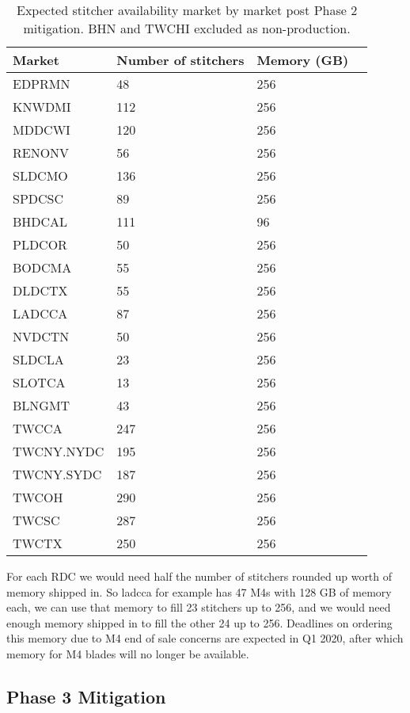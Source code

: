 \documentclass{article}
\begin{document}
\begin{table}
\begin{tabular}{|l|l|l|l|} 
\hline Market & Number of stitchers & Memory (GB)\\
\hline EDPRMN & 48 & 256\\
\hline KNWDMI & 112 & 256\\
\hline MDDCWI & 120 & 256\\
\hline RENONV & 56 & 256\\
\hline SLDCMO & 136 & 256\\
\hline SPDCSC & 89 & 256\\
\hline BHDCAL & 111 & 96\\
\hline PLDCOR & 50 & 256\\
\hline BODCMA & 55 & 256\\
\hline DLDCTX & 55 & 256\\
\hline LADCCA & 87 & 256\\
\hline NVDCTN & 50 & 256\\
\hline SLDCLA & 23 & 256\\
\hline SLOTCA & 13 & 256\\
\hline BLNGMT & 43 & 256\\
\hline TWCCA & 247 & 256\\
\hline TWCNY.NYDC & 195 & 256\\
\hline TWCNY.SYDC & 187 & 256\\
\hline TWCOH & 290 & 256\\
\hline TWCSC & 287 & 256\\
\hline TWCTX & 250 & 256\\
\hline 
\end{tabular}
\caption{\label{TABLE-marketStitcherAvailPhase2} Expected stitcher availability market by market post Phase 2 mitigation. BHN and TWCHI excluded as non-production.} 
\end{table}

For each RDC we would need half the number of stitchers rounded up worth of memory shipped in. So ladcca for example has 47 M4s with 128 GB of memory each, we can use that memory to fill 23 stitchers up to 256, and we would need enough memory shipped in to fill the other 24 up to 256. Deadlines on ordering this memory due to M4 end of sale concerns are expected in Q1 2020, after which memory for M4 blades will no longer be available. 

\subsection{Phase 3 Mitigation}
\label{SECTION-Phase3}
\end{document}
